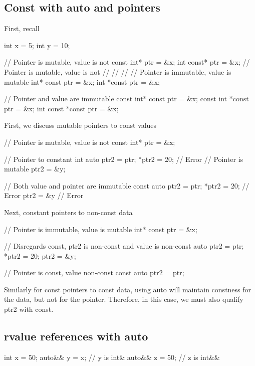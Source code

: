 \documentclass{report}
\begin{document}
\bigbreak \noindent 
\subsection{Const with auto and pointers}
\bigbreak \noindent 
First, recall
\bigbreak \noindent 
\begin{cppcode}
    int x = 5;
    int y = 10;

    // Pointer is mutable, value is not
    const int* ptr = &x; 
    int const* ptr = &x; // Pointer is mutable, value is not
    //
    // // // Pointer is immutable, value is mutable
    int* const ptr = &x;
    int *const ptr = &x;

    // Pointer and value are immutable
    const int* const ptr = &x;
    const int *const ptr = &x;
    int const *const ptr = &x;
\end{cppcode}
\bigbreak \noindent 
First, we discuss mutable pointers to const values
\bigbreak \noindent 
\begin{cppcode}
    // Pointer is mutable, value is not
    const int* ptr = &x; 

    // Pointer to constant int
    auto ptr2 = ptr;
    *ptr2 = 20; // Error
    // Pointer is mutable
    ptr2 = &y;

    // Both value and pointer are immutable
    const auto ptr2 = ptr;
    *ptr2 = 20;  // Error
    ptr2 = &y // Error
\end{cppcode}
\bigbreak \noindent 
Next, constant pointers to non-const data
\bigbreak \noindent 
\begin{cppcode}
    // Pointer is immutable, value is mutable
    int* const ptr = &x;

    // Disregards const, ptr2 is non-const and value is non-const
    auto ptr2 = ptr;
    *ptr2 = 20;
    ptr2 = &y; 

    // Pointer is const, value non-const
    const auto ptr2 = ptr;
\end{cppcode}
\bigbreak \noindent 
Similarly for const pointers to const data, using auto will maintain constness for the data, but not for the pointer. Therefore, in this case, we must also qualify ptr2 with const.

\bigbreak \noindent 
\subsection{rvalue references with auto}
\bigbreak \noindent 
\begin{cppcode}
    int x = 50;
    auto&& y = x; // y is int&
    auto&& z = 50; // z is int&&
\end{cppcode}
\end{document}

